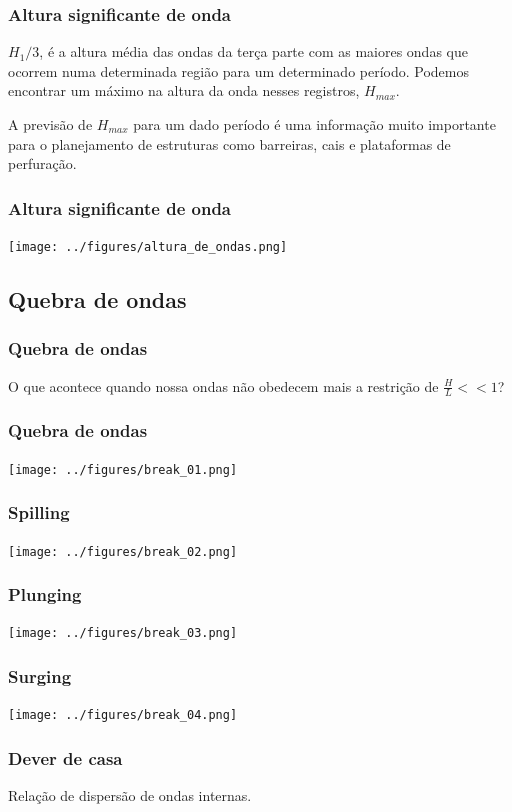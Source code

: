 \begin{frame}
\frametitle{Altura significante de onda}
  {\small
  \begin{block}{}
  $H_1/3$, é a altura média das ondas da terça parte com as maiores ondas que
  ocorrem numa determinada região para um determinado período.  Podemos
  encontrar um máximo na altura da onda nesses registros, $H_{max}$.

  A previsão de $H_{max}$ para um dado período é uma informação muito
  importante para o planejamento de estruturas como barreiras, cais e
  plataformas de perfuração.
  \end{block}
  }
\end{frame}


\begin{frame}
\frametitle{Altura significante de onda}
  \begin{center}
    \texttt{[image: ../figures/altura\_de\_ondas.png]}
  \end{center}
\end{frame}


\subsection{Quebra de ondas}
\begin{frame}
\frametitle{Quebra de ondas}
  \begin{block}{}
    O que acontece quando nossa ondas não obedecem mais a restrição de
    $\frac{H}{L} << 1$?
  \end{block}
\end{frame}

\begin{frame}
\frametitle{Quebra de ondas}
  \begin{center}
    \texttt{[image: ../figures/break\_01.png]}
  \end{center}
\end{frame}


\begin{frame}
\frametitle{Spilling}
  \begin{center}
    \texttt{[image: ../figures/break\_02.png]}
  \end{center}
\end{frame}


\begin{frame}
\frametitle{Plunging}
  \begin{center}
    \texttt{[image: ../figures/break\_03.png]}
  \end{center}
\end{frame}


\begin{frame}
\frametitle{Surging}
  \begin{center}
    \texttt{[image: ../figures/break\_04.png]}
  \end{center}
\end{frame}


\begin{frame}
\frametitle{Dever de casa}
    \begin{block}{}
      Relação de dispersão de ondas internas.
    \end{block}
\end{frame}


